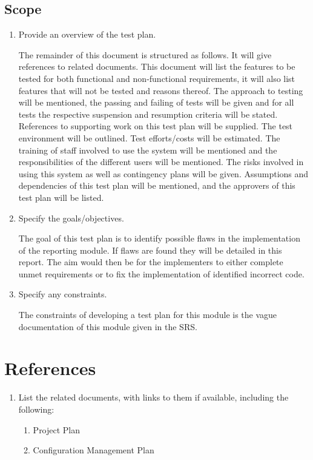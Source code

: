 \subsection{Scope}
\begin{enumerate}
	\item Provide an overview of the test plan.
		
The remainder of this document is structured as follows. It will give references to related documents. This document will   list the features to be tested for both functional and non-functional requirements, it will also list features that will not be tested and reasons thereof. The approach to testing will be mentioned, the passing and failing of tests will be given and for all tests the respective suspension and resumption criteria will be stated. References to supporting work on this test plan will be supplied. The test environment will be outlined. Test efforts/costs will be estimated. The training of staff involved to use the system will be mentioned and the responsibilities of the different users will be mentioned. The risks involved in using this system as well as contingency plans will be given. Assumptions and dependencies of this test plan will be mentioned, and the approvers of this test plan will be listed.

	\item Specify the goals/objectives.

The goal of this test plan is to identify possible flaws in the implementation of the reporting module. If flaws are found they will be detailed in this report. The aim would then be for the implementers to either complete unmet requirements or to fix the implementation of identified incorrect code.

	\item Specify any constraints.

The constraints of developing a test plan for this module is the vague documentation of this module given in the SRS.

\end{enumerate}

\section{References}

\begin{enumerate}
	\item List the related documents, with links to them if available, including the following:

\begin{enumerate}
	\item Project Plan
	\item Configuration Management Plan
\end{enumerate}
\end{enumerate}


